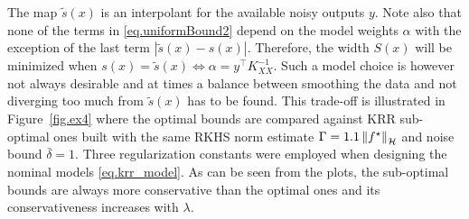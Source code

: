 The map $\tilde{s}(x)$ is an interpolant for the available noisy outputs $y$. Note also that none of the terms in \eqref{eq.uniformBound2} depend on the model weights $\alpha$ with the exception of the last term $|\tilde s(x) - s(x)|$. Therefore, the width $S(x)$ will be minimized when $s(x) = \tilde s(x) \Leftrightarrow \alpha = y^\top K_{XX}^{-1}$. Such a model choice is however not always desirable and at times a balance between smoothing the data and not diverging too much from $\tilde s(x)$ has to be found. This trade-off is illustrated in Figure~\ref{fig.ex4} where the optimal bounds are compared against KRR sub-optimal ones built with the same RKHS norm estimate $\Gamma = 1.1 \left\| f^\star \right\|_\mathcal{H}$ and noise bound $\bar \delta = 1$. Three regularization constants were employed when designing the nominal models \eqref{eq.krr_model}. As can be seen from the plots, the sub-optimal bounds are always more conservative than the optimal ones and its conservativeness increases with $\lambda$.

